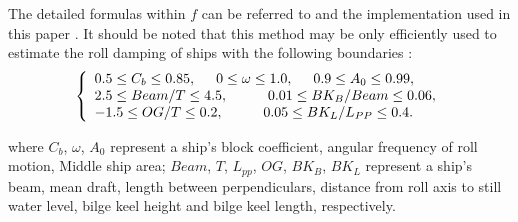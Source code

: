 The detailed formulas within $f$ can be referred to\parencite{ikeda_velocity_1979, kawahara_simple_2011} and the implementation used in this paper  \parencite{alexandersson_martinlarsalbertrolldecay-estimators_2020}.
It should be noted that this method may be only efficiently used to estimate the roll damping of ships with the following boundaries \parencite{kawahara_simple_2011}:
\begin{equation}
    \label{eq:SI_limits}
     \left\{
     \begin{array}{ll}
    0.5 \leq C_b \leq 0.85,\hspace{0.5cm} 
    0 \leq \omega \leq 1.0,
    \hspace{0.5cm}
    0.9 \leq A_0 \leq 0.99,\\
    2.5\leq Beam/T \leq 4.5, \hspace{1cm}
    0.01 \leq BK_B/Beam \leq 0.06, \\
        -1.5 \leq OG/T \leq 0.2,
     \hspace{1cm}
    0.05 \leq BK_L/L_{PP} \leq 0.4.
    \end{array}
    \right.
\end{equation}

where $C_b$, $\omega$, $A_0$ represent a ship's block coefficient, angular frequency of roll motion, Middle ship area;  $Beam$, $T$, $L_{pp}$, $OG$, $BK_B$, $BK_L$ represent a ship's beam, mean draft, length between perpendiculars, distance from roll axis to still water level, bilge keel height and bilge keel length, respectively.


